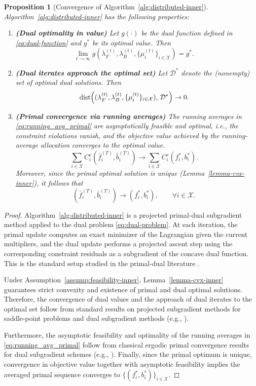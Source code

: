 \documentclass[lettersize,journal]{IEEEtran}
\newtheorem{proposition}{Proposition}
\begin{document}
\begin{proposition}[Convergence of Algorithm~\ref{alg:distributed-inner}]
\label{prop:inner_convergence}
Algorithm~\ref{alg:distributed-inner} has the following properties:
\begin{enumerate}
\item \textbf{(Dual optimality in value)} Let $g(\cdot)$ be the dual function defined in \eqref{eq:dual-function} and
$g^*$ be its optimal value. Then
\[
\lim_{t\to\infty} g\!\left(\lambda_F^{(t)},\lambda_B^{(t)},\{\mu_i^{(t)}\}_{i\in\mathcal{X}}\right)=g^*.
\]

\item \textbf{(Dual iterates approach the optimal set)} Let $\mathcal{D}^*$ denote the (nonempty) set of optimal
dual solutions. Then
\[
\mathrm{dist}\Bigl((\lambda_F^{(t)},\lambda_B^{(t)},\{\mu_i^{(t)}\}_{i\in\mathcal{X}}),\,\mathcal{D}^*\Bigr)\to 0.
\]

\item \textbf{(Primal convergence via running averages)} The running averages in \eqref{eq:running_avg_primal} are
asymptotically feasible and optimal, i.e., the constraint violations vanish, and the objective value achieved by the running-average allocation converges to the optimal value. 
\[
\sum_{i\in\mathcal{X}} C_i^e(\bar f_i^{(T)},\bar b_i^{(T)}) \to \sum_{i\in\mathcal{X}} C_i^e(f_i^*,b_i^*).
\]
Moreover, since the primal optimal solution is unique (Lemma~\ref{lemma-cvx-inner}), it follows that
\[
(\bar f_i^{(T)},\bar b_i^{(T)})\to (f_i^*,b_i^*),\qquad \forall i\in\mathcal{X}.
\]
\end{enumerate}
\end{proposition}

\begin{proof}
Algorithm~\ref{alg:distributed-inner} is a projected primal-dual subgradient method applied to the
dual problem \eqref{eq:dual-problem}. At each iteration, the primal update computes an exact minimizer of the Lagrangian
given the current multipliers, and the dual update performs a projected ascent step using the corresponding constraint
residuals as a subgradient of the concave dual function. This is the standard setup studied in
the primal-dual literature \cite{boyd2004convex,palomar2006tutorial,nedic2009approximate,nedic2009subgradient}.

Under Assumption~\ref{assump:feasibility-inner}, Lemma~\ref{lemma-cvx-inner} guarantees strict convexity and existence of primal and dual optimal solutions. Therefore, the convergence of dual values and the approach of dual iterates to the optimal set follow from standard results on projected subgradient methods for saddle-point problems and dual subgradient methods (e.g., \cite{nedic2009subgradient,palomar2006tutorial}).

Furthermore, the asymptotic feasibility and optimality of the running averages in \eqref{eq:running_avg_primal} follow from classical ergodic primal convergence results for dual subgradient schemes (e.g., \cite{larsson1999ergodic,nedic2009approximate}). Finally, since the primal optimum is unique, convergence in
objective value together with asymptotic feasibility implies the averaged primal sequence converges to
$\{(f_i^*,b_i^*)\}_{i\in\mathcal{X}}$.
\end{proof}
\end{document}
